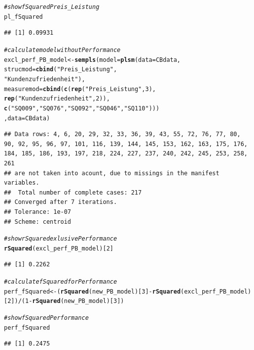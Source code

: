 \documentclass{article}\usepackage[]{graphicx}\usepackage[]{color}
\makeatletter
\newcommand{\hlnum}[1]{\textcolor[rgb]{0.686,0.059,0.569}{#1}}%
\newcommand{\hlstr}[1]{\textcolor[rgb]{0.192,0.494,0.8}{#1}}%
\newcommand{\hlcom}[1]{\textcolor[rgb]{0.678,0.584,0.686}{\textit{#1}}}%
\newcommand{\hlopt}[1]{\textcolor[rgb]{0,0,0}{#1}}%
\newcommand{\hlstd}[1]{\textcolor[rgb]{0.345,0.345,0.345}{#1}}%
\newcommand{\hlkwb}[1]{\textcolor[rgb]{0.69,0.353,0.396}{#1}}%
\newcommand{\hlkwc}[1]{\textcolor[rgb]{0.333,0.667,0.333}{#1}}%
\newcommand{\hlkwd}[1]{\textcolor[rgb]{0.737,0.353,0.396}{\textbf{#1}}}%
\newenvironment{kframe}{%
 \def\at@end@of@kframe{}%
 \ifinner\ifhmode%
  \def\at@end@of@kframe{\end{minipage}}%
  \begin{minipage}{\columnwidth}%
 \fi\fi%
 \def\FrameCommand##1{\hskip\@totalleftmargin \hskip-\fboxsep
 \colorbox{shadecolor}{##1}\hskip-\fboxsep
     \hskip-\linewidth \hskip-\@totalleftmargin \hskip\columnwidth}%
 \MakeFramed {\advance\hsize-\width
   \@totalleftmargin\z@ \linewidth\hsize
   \@setminipage}}%
 {\par\unskip\endMakeFramed%
 \at@end@of@kframe}
\newenvironment{knitrout}{}{} %
\makeatother
\begin{document}
\begin{knitrout}
\begin{kframe}
\begin{alltt}
\hlcom{#show fSquared Preis_Leistung}
\hlstd{pl_fSquared}
\end{alltt}
\begin{verbatim}
## [1] 0.09931
\end{verbatim}
\begin{alltt}
\hlcom{#calculate model without Performance}
\hlstd{excl_perf_PB_model} \hlkwb{<-} \hlkwd{sempls}\hlstd{(}\hlkwc{model} \hlstd{=} \hlkwd{plsm}\hlstd{(}\hlkwc{data} \hlstd{= CBdata,}
                \hlkwc{strucmod} \hlstd{=} \hlkwd{cbind}\hlstd{(}\hlstr{"Preis_Leistung"}\hlstd{,}
                                 \hlstr{"Kundenzufriedenheit"}\hlstd{),}
                \hlkwc{measuremod} \hlstd{=} \hlkwd{cbind}\hlstd{(}\hlkwd{c}\hlstd{(}\hlkwd{rep}\hlstd{(}\hlstr{"Preis_Leistung"}\hlstd{,}\hlnum{3}\hlstd{),}
                                     \hlkwd{rep}\hlstd{(}\hlstr{"Kundenzufriedenheit"}\hlstd{,}\hlnum{2}\hlstd{)),}
                                   \hlkwd{c}\hlstd{(}\hlstr{"SQ009"}\hlstd{,}\hlstr{"SQ076"}\hlstd{,}\hlstr{"SQ092"}\hlstd{,}\hlstr{"SQ046"}\hlstd{,}\hlstr{"SQ110"}\hlstd{)))}
                \hlstd{,}\hlkwc{data} \hlstd{= CBdata)}
\end{alltt}
\begin{verbatim}
## Data rows: 4, 6, 20, 29, 32, 33, 36, 39, 43, 55, 72, 76, 77, 80, 90, 92, 95, 96, 97, 101, 116, 139, 144, 145, 153, 162, 163, 175, 176, 184, 185, 186, 193, 197, 218, 224, 227, 237, 240, 242, 245, 253, 258, 261 
## are not taken into acount, due to missings in the manifest variables.
##  Total number of complete cases: 217 
## Converged after 7 iterations.
## Tolerance: 1e-07
## Scheme: centroid
\end{verbatim}
\begin{alltt}
\hlcom{#show rSquared exlusive Performance}
\hlkwd{rSquared}\hlstd{(excl_perf_PB_model)[}\hlnum{2}\hlstd{]}
\end{alltt}
\begin{verbatim}
## [1] 0.2262
\end{verbatim}
\begin{alltt}
\hlcom{#calculate fSquared for Performance}
\hlstd{perf_fSquared} \hlkwb{<-} \hlstd{(}\hlkwd{rSquared}\hlstd{(new_PB_model)[}\hlnum{3}\hlstd{]}\hlopt{-}\hlkwd{rSquared}\hlstd{(excl_perf_PB_model)[}\hlnum{2}\hlstd{])}\hlopt{/}\hlstd{(}\hlnum{1}\hlopt{-}\hlkwd{rSquared}\hlstd{(new_PB_model)[}\hlnum{3}\hlstd{])}

\hlcom{#show fSquared Performance}
\hlstd{perf_fSquared}
\end{alltt}
\begin{verbatim}
## [1] 0.2475
\end{verbatim}
\end{kframe}
\end{knitrout}
\end{document}
